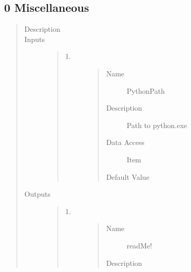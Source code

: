 \documentclass[letterpaper,10pt,english]{sphinxmanual}
\begin{document}
\subsection{0 \textbar{} Miscellaneous}
\label{\detokenize{components:miscellaneous}}
\begin{quote}\begin{description}
\item[{Description}] \leavevmode
{}

\item[{Inputs}] \leavevmode\begin{quote}\begin{description}
\item[{1.}] \leavevmode\begin{quote}\begin{description}
\item[{Name}] \leavevmode
PythonPath

\item[{Description}] \leavevmode
Path to python.exe

\item[{Data Access}] \leavevmode
Item

\item[{Default Value}] \leavevmode
{}

\end{description}\end{quote}

\end{description}\end{quote}

\item[{Outputs}] \leavevmode\begin{quote}\begin{description}
\item[{1.}] \leavevmode\begin{quote}\begin{description}
\item[{Name}] \leavevmode
readMe!

\item[{Description}] \leavevmode
{}


\end{description}
\end{quote}
\end{description}
\end{quote}
\end{description}
\end{quote}
\end{document}
